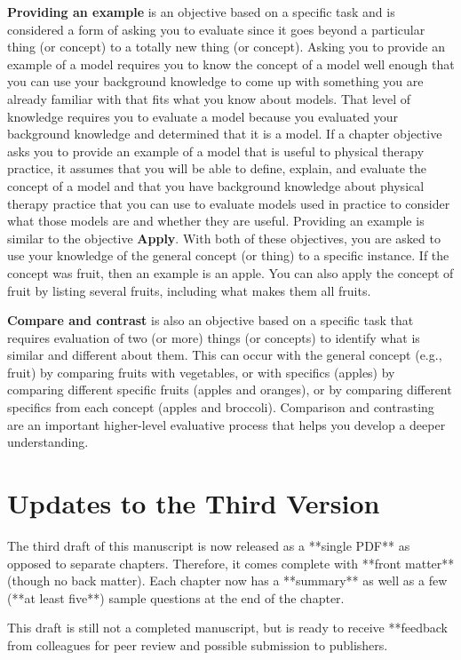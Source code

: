 \textbf{Providing an example} is an objective based on a specific task and is considered a form of asking you to evaluate since it goes beyond a particular thing (or concept) to a totally new thing (or concept). Asking you to provide an example of a model requires you to know the concept of a model well enough that you can use your background knowledge to come up with something you are already familiar with that fits what you know about models. That level of knowledge requires you to evaluate a model because you evaluated your background knowledge and determined that it is a model. If a chapter objective asks you to provide an example of a model that is useful to physical therapy practice, it assumes that you will be able to define, explain, and evaluate the concept of a model and that you have background knowledge about physical therapy practice that you can use to evaluate models used in practice to consider what those models are and whether they are useful. Providing an example is similar to the objective \textbf{Apply}. With both of these objectives, you are asked to use your knowledge of the general concept (or thing) to a specific instance. If the concept was fruit, then an example is an apple. You can also apply the concept of fruit by listing several fruits, including what makes them all fruits.

\textbf{Compare and contrast} is also an objective based on a specific task that requires evaluation of two (or more) things (or concepts) to identify what is similar and different about them. This can occur with the general concept (e.g., fruit) by comparing fruits with vegetables, or with specifics (apples) by comparing different specific fruits (apples and oranges), or by comparing different specifics from each concept (apples and broccoli). Comparison and contrasting are an important higher-level evaluative process that helps you develop a deeper understanding.

\section*{Updates to the Third Version}

The third draft of this manuscript is now released as a **single PDF** as opposed to separate chapters. Therefore, it comes complete with **front matter** (though no back matter). Each chapter now has a **summary** as well as a few (**at least five**) sample questions at the end of the chapter.  

This draft is still not a completed manuscript, but is ready to receive **feedback from colleagues for peer review and possible submission to publishers.  

